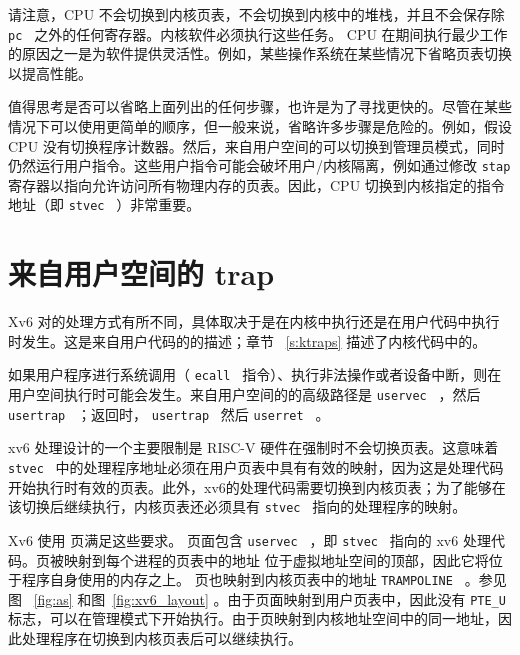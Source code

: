请注意，CPU 不会切换到内核页表，不会切换到内核中的堆栈，并且不会保存除  {    \tt    pc   }  之外的任何寄存器。内核软件必须执行这些任务。 CPU 在期间执行最少工作的原因之一是为软件提供灵活性。例如，某些操作系统在某些情况下省略页表切换以提高性能。  

值得思考是否可以省略上面列出的任何步骤，也许是为了寻找更快的。尽管在某些情况下可以使用更简单的顺序，但一般来说，省略许多步骤是危险的。例如，假设 CPU 没有切换程序计数器。然后，来自用户空间的可以切换到管理员模式，同时仍然运行用户指令。这些用户指令可能会破坏用户/内核隔离，例如通过修改  {    \tt    stap   }  寄存器以指向允许访问所有物理内存的页表。因此，CPU 切换到内核指定的指令地址（即  {    \tt    stvec   }  ）非常重要。  

   \section{来自用户空间的 trap  }     

Xv6 对的处理方式有所不同，具体取决于是在内核中执行还是在用户代码中执行时发生。这是来自用户代码的的描述；章节~    \ref{s:ktraps}    描述了内核代码中的。  

如果用户程序进行系统调用（ {    \tt    ecall   }  指令）、执行非法操作或者设备中断，则在用户空间执行时可能会发生。来自用户空间的的高级路径是
  {    \tt    uservec   } 
     ，然后  {    \tt    usertrap   } 
      ；返回时，
  {    \tt    usertrap   } 
      然后
  {    \tt    userret   } 
     。  

xv6 处理设计的一个主要限制是 RISC-V 硬件在强制时不会切换页表。这意味着  {    \tt    stvec   }  中的处理程序地址必须在用户页表中具有有效的映射，因为这是处理代码开始执行时有效的页表。此外，xv6的处理代码需要切换到内核页表；为了能够在该切换后继续执行，内核页表还必须具有  {    \tt    stvec   }  指向的处理程序的映射。  

Xv6 使用        页满足这些要求。  页面包含  {    \tt    uservec   }  ，即  {    \tt    stvec   }  指向的 xv6 处理代码。页被映射到每个进程的页表中的地址
        位于虚拟地址空间的顶部，因此它将位于程序自身使用的内存之上。 页也映射到内核页表中的地址  {    \tt    TRAMPOLINE   } 。参见图~    \ref{fig:as}    和图~\ref{fig:xv6_layout}    。由于页面映射到用户页表中，因此没有  {    \tt    PTE\_U   }  标志，可以在管理模式下开始执行。由于页映射到内核地址空间中的同一地址，因此处理程序在切换到内核页表后可以继续执行。  

